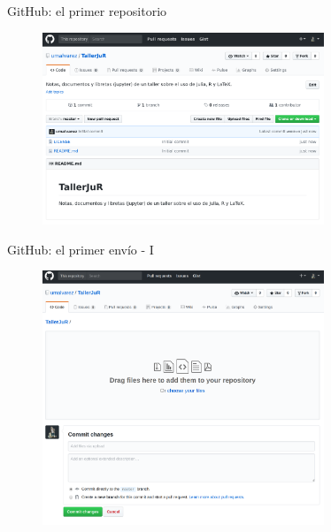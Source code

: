 \documentclass{beamer}
\begin{document}
\begin{frame}{GitHub: el primer repositorio}
  \begin{figure}[hp]
    \centering \includegraphics[width=0.75\textwidth]{fig/02The1stRepo}
    \label{fig:git1st}
  \end{figure}
\end{frame}

\begin{frame}{GitHub: el primer env\'i{}o - I}
  \begin{figure}[hp]
    \centering \includegraphics[width=0.75\textwidth]{fig/03The1stCommit}
    \label{fig:git1stci}
  \end{figure}
\end{frame}
\end{document}
